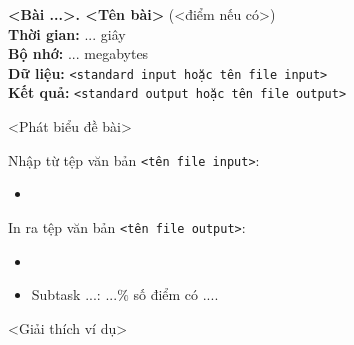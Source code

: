 \begin{problem}{}{}{}{}{}
\vspace{-4.0em}
\begin{center}
    {\LARGE\textbf{<Bài ...>. <Tên bài>} (<điểm nếu có>)}\\[0.7em]
    \textbf{Thời gian:} ... giây \\ %
    \textbf{Bộ nhớ:} ... megabytes \\ %
    \textbf{Dữ liệu:} \texttt{<standard input hoặc tên file input>} \\
    \textbf{Kết quả:} \texttt{<standard output hoặc tên file output>}
\end{center}

<Phát biểu đề bài>

\medskip

\InputFile

Nhập từ tệp văn bản \texttt{<tên file input>}: %

\begin{itemize}
    \item <Định dạng input kèm ràng buộc> %
\end{itemize}

\OutputFile

In ra tệp văn bản \texttt{<tên file output>}: %

\begin{itemize}
    \item <Định dạng output>
\end{itemize}

\Subtask{}
\begin{itemize}
    \item Subtask ...: $...\%$ số điểm có ....
\end{itemize}

\medskip

\Examples
\begin{center}
\begin{example}
%
%
\end{example}
\end{center}


\Note

<Giải thích ví dụ>


\end{problem}
